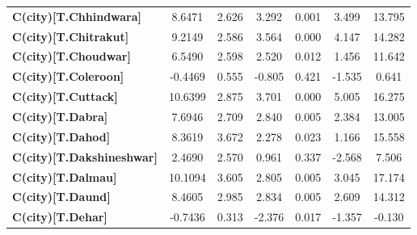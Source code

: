 \begin{center}
\begin{tabular}{lcccccc}
\textbf{C(city)[T.Chhindwara]}                                                                      &       8.6471  &        2.626     &     3.292  &         0.001        &        3.499    &       13.795     \\
\textbf{C(city)[T.Chitrakut]}                                                                       &       9.2149  &        2.586     &     3.564  &         0.000        &        4.147    &       14.282     \\
\textbf{C(city)[T.Choudwar]}                                                                        &       6.5490  &        2.598     &     2.520  &         0.012        &        1.456    &       11.642     \\
\textbf{C(city)[T.Coleroon]}                                                                        &      -0.4469  &        0.555     &    -0.805  &         0.421        &       -1.535    &        0.641     \\
\textbf{C(city)[T.Cuttack]}                                                                         &      10.6399  &        2.875     &     3.701  &         0.000        &        5.005    &       16.275     \\
\textbf{C(city)[T.Dabra]}                                                                           &       7.6946  &        2.709     &     2.840  &         0.005        &        2.384    &       13.005     \\
\textbf{C(city)[T.Dahod]}                                                                           &       8.3619  &        3.672     &     2.278  &         0.023        &        1.166    &       15.558     \\
\textbf{C(city)[T.Dakshineshwar]}                                                                   &       2.4690  &        2.570     &     0.961  &         0.337        &       -2.568    &        7.506     \\
\textbf{C(city)[T.Dalmau]}                                                                          &      10.1094  &        3.605     &     2.805  &         0.005        &        3.045    &       17.174     \\
\textbf{C(city)[T.Daund]}                                                                           &       8.4605  &        2.985     &     2.834  &         0.005        &        2.609    &       14.312     \\
\textbf{C(city)[T.Dehar]}                                                                           &      -0.7436  &        0.313     &    -2.376  &         0.017        &       -1.357    &       -0.130     \\

\end{tabular}
\end{center}
